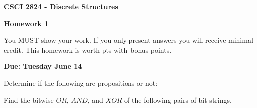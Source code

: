 \documentclass[addpoints, answers]{exam}
\begin{document}
\singlespacing

\begin{center}
  {\large\textbf{CSCI 2824 - Discrete Structures}}

  {\large\textbf{Homework 1}}
\end{center}

You MUST show your work. If you only present answers you will receive minimal
credit. This homework is worth \numpoints pts with \numbonuspoints \,bonus
points.

\textbf{Due: Tuesday June 14}


\begin{questions}
  \question[4] Determine if the following are propositions or not:

  \question[9] Find the bitwise $OR$, $AND$, and $XOR$ of the following pairs
  of bit strings.
 \begin{parts}

\end{parts}
\end{questions}
\end{document}
